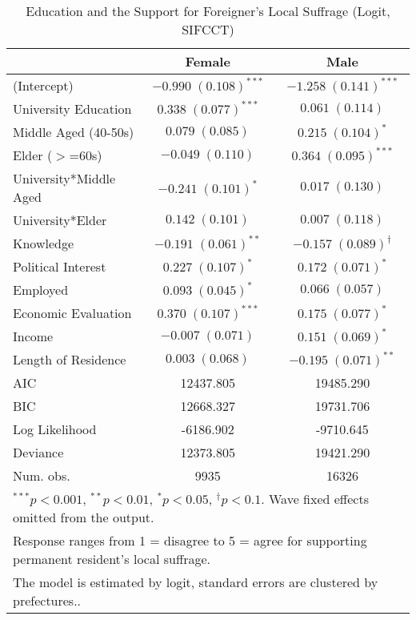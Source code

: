 
\begin{table}
\caption{Education and the Support for Foreigner's Local Suffrage (Logit, SIFCCT)}
\begin{center}
\begin{tabular}{l c c }
\toprule
 & Female & Male \\
\midrule
(Intercept)            & $-0.990 \; (0.108)^{***}$ & $-1.258 \; (0.141)^{***}$     \\
University Education   & $0.338 \; (0.077)^{***}$  & $0.061 \; (0.114)$            \\
Middle Aged (40-50s)   & $0.079 \; (0.085)$        & $0.215 \; (0.104)^{*}$        \\
Elder ($>$=60s)        & $-0.049 \; (0.110)$       & $0.364 \; (0.095)^{***}$      \\
University*Middle Aged & $-0.241 \; (0.101)^{*}$   & $0.017 \; (0.130)$            \\
University*Elder       & $0.142 \; (0.101)$        & $0.007 \; (0.118)$            \\
Knowledge              & $-0.191 \; (0.061)^{**}$  & $-0.157 \; (0.089)^{\dagger}$ \\
Political Interest     & $0.227 \; (0.107)^{*}$    & $0.172 \; (0.071)^{*}$        \\
Employed               & $0.093 \; (0.045)^{*}$    & $0.066 \; (0.057)$            \\
Economic Evaluation    & $0.370 \; (0.107)^{***}$  & $0.175 \; (0.077)^{*}$        \\
Income                 & $-0.007 \; (0.071)$       & $0.151 \; (0.069)^{*}$        \\
Length of Residence    & $0.003 \; (0.068)$        & $-0.195 \; (0.071)^{**}$      \\
\midrule
AIC                    & 12437.805                 & 19485.290                     \\
BIC                    & 12668.327                 & 19731.706                     \\
Log Likelihood         & -6186.902                 & -9710.645                     \\
Deviance               & 12373.805                 & 19421.290                     \\
Num. obs.              & 9935                      & 16326                         \\
\bottomrule
\multicolumn{3}{l}{\scriptsize{$^{***}p<0.001$, $^{**}p<0.01$, $^*p<0.05$, $^{\dagger}p<0.1$. Wave fixed effects omitted from the output.}} \\ \multicolumn{3}{l}{\scriptsize{Response ranges from 1 = disagree to 5 = agree for supporting permanent resident's local suffrage.}} \\ \multicolumn{3}{l}{\scriptsize{The model is estimated by logit, standard errors are clustered by prefectures..}}
\end{tabular}
\label{lgtab_smo}
\end{center}
\end{table}

